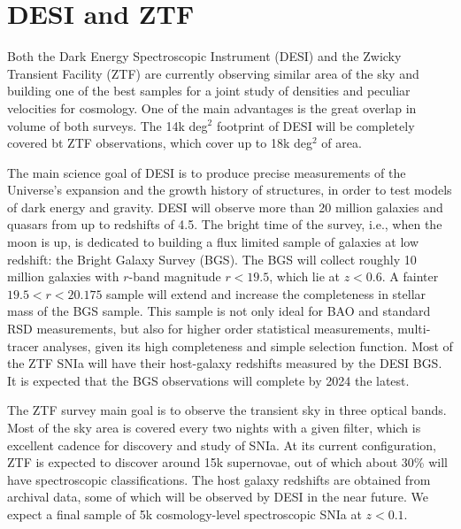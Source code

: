 \begin{table}
\begin{tabular}{lllc}
        \hline 
        \hline 
    \end{tabular}
\end{table}


\section{DESI and ZTF}
\label{velocities:desi_ztf}

Both the Dark Energy Spectroscopic Instrument (DESI) and the Zwicky Transient Facility (ZTF)
are currently observing similar area of the sky and building one of the best samples for a joint study of 
densities and peculiar velocities for cosmology. 
One of the main advantages is the great overlap in volume of both surveys. The 14k deg$^2$ footprint 
of DESI will be completely covered bt ZTF observations, which cover up to 18k deg$^2$ of area. 

The main science goal of DESI is to produce precise measurements of the Universe's expansion and 
the growth history of structures, in order to test models of dark energy and gravity. 
DESI will observe more than 20 million galaxies and quasars from up to redshifts of 4.5. 
The bright time of the survey, i.e., when the moon is up, is dedicated to building a flux limited sample of
galaxies at low redshift: the Bright Galaxy Survey (BGS). The BGS will collect roughly 10 million galaxies 
with $r$-band magnitude $r < 19.5$, which lie at $z < 0.6$. 
A fainter  $19.5<r<20.175$ sample will extend and increase the completeness in stellar mass of the BGS sample. 
This sample is not only ideal for BAO and standard RSD measurements, but also for higher order statistical 
measurements, multi-tracer analyses, given its high completeness and simple selection function. 
Most of the ZTF SNIa will have their host-galaxy redshifts measured by the DESI BGS.
It is expected that the BGS observations will complete by 2024 the latest. 

The ZTF survey main goal is to observe the transient sky in three optical bands. 
Most of the sky area is covered every two nights with a given filter, which is excellent cadence 
for discovery and study of SNIa. 
At its current configuration, ZTF is expected to discover around 15k supernovae, 
out of which about 30\% will have spectroscopic classifications. 
The host galaxy redshifts are obtained from archival data, some of which will be observed by DESI 
in the near future. We expect a final sample of 5k cosmology-level spectroscopic SNIa at  
$z < 0.1$. 

